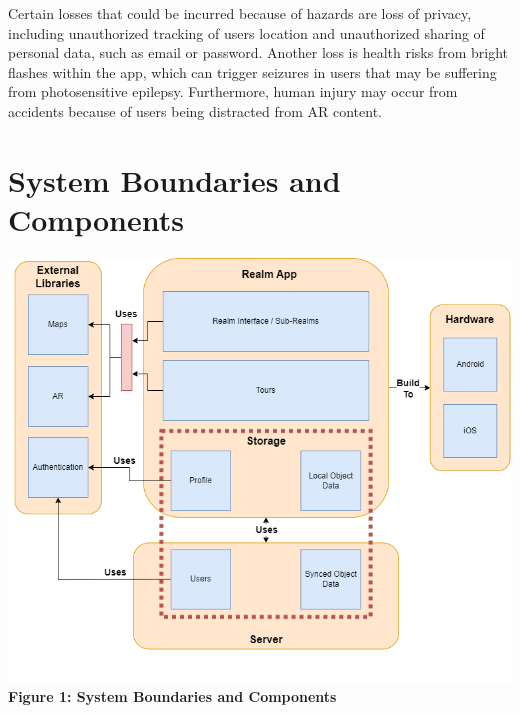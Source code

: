 \documentclass{article}
\begin{document}
Certain losses that could be incurred because of hazards are loss of privacy, including unauthorized tracking of users location and unauthorized sharing of personal data, such as email or password. Another loss is health risks from bright flashes within the app, which can trigger seizures in users that may be suffering from photosensitive epilepsy. Furthermore, human injury may occur from accidents because of users being distracted from AR content.

\section{System Boundaries and Components}

\begin{center}
    \includegraphics[scale=0.4]{sys_bound_comp.png}\\
    \textbf{Figure 1: System Boundaries and Components}
\end{center}
\end{document}
